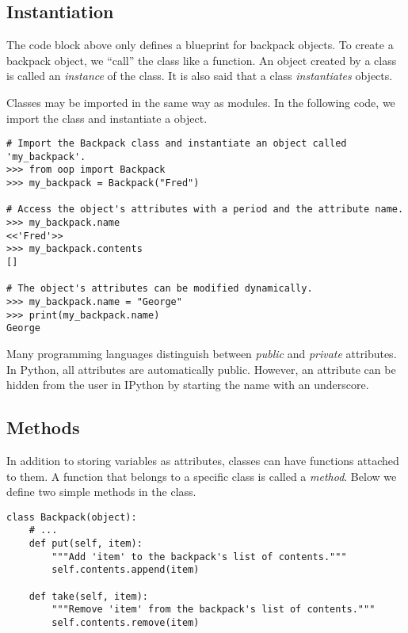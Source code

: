 \subsection*{Instantiation} %

The  code block above only defines a blueprint for backpack objects.
To create a backpack object, we ``call'' the class like a function.
An object created by a class is called an \emph{instance} of the class.
It is also said that a class \emph{instantiates} objects.

Classes may be imported in the same way as modules.
In the following code, we import the  class and instantiate a  object.

\begin{lstlisting}
# Import the Backpack class and instantiate an object called 'my_backpack'.
>>> from oop import Backpack
>>> my_backpack = Backpack("Fred")

# Access the object's attributes with a period and the attribute name.
>>> my_backpack.name
<<'Fred'>>
>>> my_backpack.contents
[]

# The object's attributes can be modified dynamically.
>>> my_backpack.name = "George"
>>> print(my_backpack.name)
George
\end{lstlisting}

\begin{info}
Many programming languages distinguish between \emph{public} and \emph{private} attributes.
In Python, all attributes are automatically public.
However, an attribute can be hidden from the user in IPython by starting the name with an underscore. %
\end{info}

\subsection*{Methods} %

In addition to storing variables as attributes, classes can have functions attached to them.
A function that belongs to a specific class is called a \emph{method}.
Below we define two simple methods in the  class.

\begin{lstlisting}
class Backpack(object):
    # ...
    def put(self, item):
        """Add 'item' to the backpack's list of contents."""
        self.contents.append(item)

    def take(self, item):
        """Remove 'item' from the backpack's list of contents."""
        self.contents.remove(item)
\end{lstlisting}

